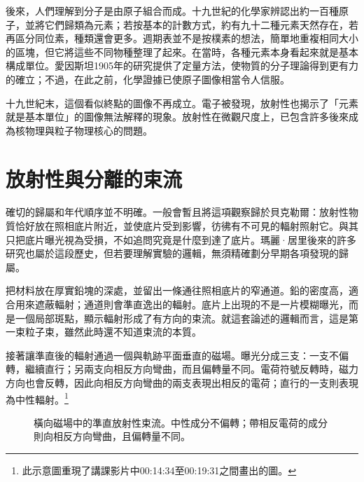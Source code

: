 後來，人們理解到分子是由原子組合而成。十九世紀的化學家辨認出約一百種原子，並將它們歸類為元素；若按基本的計數方式，約有九十二種元素天然存在，若再區分同位素，種類還會更多。週期表並不是按樸素的想法，簡單地重複相同大小的區塊，但它將這些不同物種整理了起來。在當時，各種元素本身看起來就是基本構成單位。愛因斯坦1905年的研究提供了定量方法，使物質的分子理論得到更有力的確立；不過，在此之前，化學證據已使原子圖像相當令人信服。

十九世紀末，這個看似終點的圖像不再成立。電子被發現，放射性也揭示了「元素就是基本單位」的圖像無法解釋的現象。放射性在微觀尺度上，已包含許多後來成為核物理與粒子物理核心的問題。

\section{放射性與分離的束流}

確切的歸屬和年代順序並不明確。一般會暫且將這項觀察歸於貝克勒爾：放射性物質恰好放在照相底片附近，並使底片受到影響，彷彿有不可見的輻射照射它。與其只把底片曝光視為受損，不如追問究竟是什麼到達了底片。瑪麗·居里後來的許多研究也屬於這段歷史，但若要理解實驗的邏輯，無須精確劃分早期各項發現的歸屬。

把材料放在厚實鉛塊的深處，並留出一條通往照相底片的窄通道。鉛的密度高，適合用來遮蔽輻射；通道則會準直逸出的輻射。底片上出現的不是一片模糊曝光，而是一個局部斑點，顯示輻射形成了有方向的束流。就這套論述的邏輯而言，這是第一束粒子束，雖然此時還不知道束流的本質。

接著讓準直後的輻射通過一個與軌跡平面垂直的磁場。曝光分成三支：一支不偏轉，繼續直行；另兩支向相反方向彎曲，而且偏轉量不同。電荷符號反轉時，磁力方向也會反轉，因此向相反方向彎曲的兩支表現出相反的電荷；直行的一支則表現為中性輻射。\footnote{此示意圖重現了講課影片中00:14:34至00:19:31之間畫出的圖。}

\begin{figure}[h]
\centering
{}
\caption{橫向磁場中的準直放射性束流。中性成分不偏轉；帶相反電荷的成分則向相反方向彎曲，且偏轉量不同。}
\end{figure}

